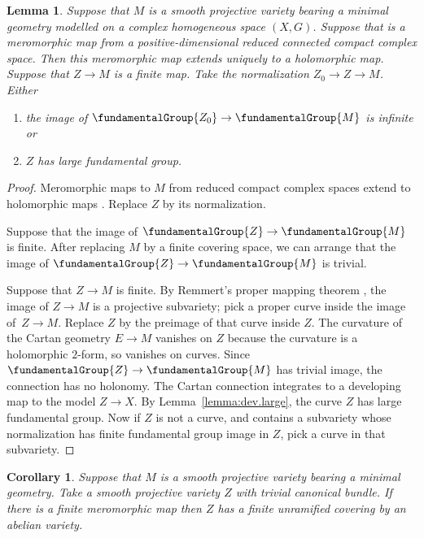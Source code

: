 \documentclass[pdftex]{sigma}
\numberwithin{equation}{section}
\newtheorem{Corollary}[Theorem]{Corollary}
\newtheorem{Lemma}[Theorem]{Lemma}
\begin{document}
\begin{Lemma}\label{lemma:large}
Suppose that $M$ is a smooth projective variety bearing a minimal geometry modelled on a complex homogeneous space $(X, G)$.
Suppose that  is a meromorphic map from a positive-dimensional reduced connected compact complex space.
Then this meromorphic map extends uniquely to a holomorphic map.
Suppose that $Z \to M$ is a finite map.
Take the normalization $Z_0 \to Z \to M$.
Either
\begin{enumerate}\itemsep=0pt
\item[$(1)$]
the image of $\fundamentalGroup{Z_0} \to \fundamentalGroup{M}$ is infinite or
\item[$(2)$]
$Z$ has large fundamental group.
\end{enumerate}
\end{Lemma}

\begin{proof}
Meromorphic maps to $M$ from reduced compact complex spaces extend to holomorphic maps \cite[Lemma 26]{Biswas.McKay:2016}.
Replace $Z$ by its normalization.

Suppose that the image of $\fundamentalGroup{Z} \to \fundamentalGroup{M}$ is finite.
After replacing $M$ by a finite covering space, we can arrange that the image of $\fundamentalGroup{Z}
\to \fundamentalGroup{M}$ is trivial.

Suppose that $Z \to M$ is finite.
By Remmert's proper mapping theorem \cite[p.~213]{Grauert.Remmert:1984}, the image of $Z
 \to M$ is a projective subvariety;
pick a proper curve inside the image of~${Z \to M}$.
Replace $Z$ by the preimage of that curve inside $Z$.
The curvature of the Cartan geometry ${E \to M}$ vanishes on $Z$ because the curvature is a holomorphic $2$-form, so vanishes on curves.
Since $\fundamentalGroup{Z} \to \fundamentalGroup{M}$ has trivial image, the connection has no holonomy.
The Cartan connection integrates to a developing map to the model $Z \to X$.
By Lemma~\ref{lemma:dev.large}, the curve $Z$ has large fundamental group.
Now if $Z$ is not a curve, and contains a subvariety whose normalization has
finite fundamental group image in $Z$, pick a curve in that subvariety.
\end{proof}

\begin{Corollary}\label{corollary:tori}
Suppose that $M$ is a smooth projective variety bearing a minimal geometry.
Take a smooth projective variety $Z$ with trivial canonical bundle.
If there is a finite meromorphic map  then $Z$ has a finite unramified covering by an abelian variety.
\end{Corollary}
\end{document}
